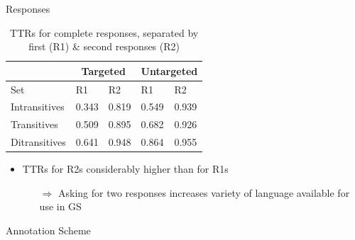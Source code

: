 \documentclass[final,t]{beamer}
\begin{document}
\begin{frame}{}
\begin{columns}[t]
\begin{column}{.33\linewidth}
\begin{block}{Responses}
\begin{center}
\begin{minipage}{.85\textwidth}
\begin{table}[hb!]
\begin{center}
\begin{tabular}{|l||l|l||l|l|}
\hline
 & \multicolumn{2}{|c||}{Targeted} & \multicolumn{2}{|c|}{Untargeted} \\
\hline
 Set & R1 & R2 & R1 & R2 \\
\hline
\hline
Intransitives & 0.343 & 0.819 & 0.549 & 0.939 \\
\hline
Transitives & 0.509 & 0.895 & 0.682 & 0.926 \\
\hline
Ditransitives & 0.641 & 0.948 & 0.864 & 0.955  \\ 
\hline
\end{tabular}
\caption{\label{tab:ttr1v2} TTRs for complete responses, separated by first (R1) \& second responses (R2)} %
\end{center}
\end{table}

\begin{itemize}
\item TTRs for R2s considerably higher than for R1s
  \begin{itemize}
  \item[$\Rightarrow$] Asking for two responses increases variety of
    language available for use in GS
  \end{itemize}
\end{itemize}
\vspace{.5em}

\end{minipage}
\end{center}
\vspace{-.5em}
\end{block} 

\begin{block}{Annotation Scheme}
\begin{center}
\begin{minipage}{.85\textwidth}


\end{minipage}
\end{center}
\end{block}
\end{column}
\end{columns}
\end{frame}
\end{document}
